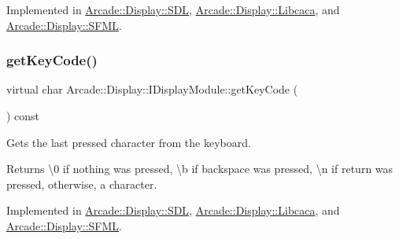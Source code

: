 Implemented in \mbox{\hyperlink{classArcade_1_1Display_1_1SDL_a1ca09d130dea3bec2481eb72a49c0f03}{Arcade\+::\+Display\+::\+S\+DL}}, \mbox{\hyperlink{classArcade_1_1Display_1_1Libcaca_a6aee007c10e66709680d1ec80f2662a4}{Arcade\+::\+Display\+::\+Libcaca}}, and \mbox{\hyperlink{classArcade_1_1Display_1_1SFML_ae1466db8c13b08e99ebe5ffab68884c7}{Arcade\+::\+Display\+::\+S\+F\+ML}}.

\mbox{\label{classArcade_1_1Display_1_1IDisplayModule_a403f8a0f065dad707a881ef3cee79805}} 
\subsubsection{\texorpdfstring{getKeyCode()}{getKeyCode()}}
{\footnotesize\ttfamily virtual char Arcade\+::\+Display\+::\+I\+Display\+Module\+::get\+Key\+Code (\begin{DoxyParamCaption}{ }\end{DoxyParamCaption}) const\hspace{0.3cm}{\ttfamily [pure virtual]}}



Gets the last pressed character from the keyboard. 

\begin{DoxyReturn}{Returns}
\textbackslash{}0 if nothing was pressed, \textbackslash{}b if backspace was pressed, \textbackslash{}n if return was pressed, otherwise, a character. 
\end{DoxyReturn}


Implemented in \mbox{\hyperlink{classArcade_1_1Display_1_1SDL_a3ba94b49b72c9e189f52af7b97f4ad91}{Arcade\+::\+Display\+::\+S\+DL}}, \mbox{\hyperlink{classArcade_1_1Display_1_1Libcaca_a741fdec5c2e77cc7959e5f3444f8c8ac}{Arcade\+::\+Display\+::\+Libcaca}}, and \mbox{\hyperlink{classArcade_1_1Display_1_1SFML_ae2bf9e9c157a9f0ae8d1b60bd072e881}{Arcade\+::\+Display\+::\+S\+F\+ML}}.

\mbox{\label{classArcade_1_1Display_1_1IDisplayModule_a0d8e957815e94766bdefbd7a5043e81a}} 
